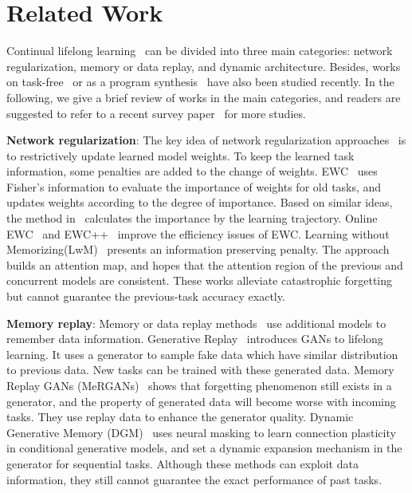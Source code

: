 \documentclass{article}
\begin{document}
\section{Related Work}
Continual lifelong learning~\cite{lifelong_review19} can be divided into three main categories: network regularization, memory or data replay, and dynamic architecture.
Besides, works on task-free~\cite{19CVPR_Aljundi} or as a program synthesis~\cite{18NeurIPS_Valkov} have also been studied recently.
In the following, we give a brief review of works in the main categories, and readers are suggested to refer to a recent survey paper~\cite{lifelong_review19} for more studies.


\noindent\textbf{Network regularization}: 
The key idea of network regularization approaches~\cite{kirkpatrick2017overcoming,zenke2017continual, 17NeurIPS_Lee, Ritter2018OnlineSL,ICML18_Schwarz_ProgressC,chaudhry2018riemannian,dhar2018learning} is to restrictively update learned model weights.
To keep the learned task information, some penalties are added to the change of weights. 
EWC~\cite{kirkpatrick2017overcoming} uses Fisher's information to evaluate the importance of weights for old tasks, and updates weights according to the degree of importance. 
Based on similar ideas, the method in~\cite{zenke2017continual} calculates the importance by the learning trajectory. 
Online EWC~\cite{ICML18_Schwarz_ProgressC} and EWC++~\cite{chaudhry2018riemannian} improve the efficiency issues of EWC. 
Learning without Memorizing(LwM)~\cite{dhar2018learning} presents an information preserving penalty. 
The approach builds an attention map, and hopes that the attention region of the previous and concurrent models are consistent.
These works alleviate catastrophic forgetting but cannot guarantee the previous-task accuracy exactly.


\noindent\textbf{Memory replay}: 
Memory or data replay methods~\cite{rebuffi2017icarl, shin2017continual, kemker2017fearnet, brahma2018subset, Wu2018IncrementalCL,  wu2018memory,  19ICLR_Hu, 19AAAI_Riemer, 19ICLR_Riemer, ostapenko2019learning} use additional models to remember data information. 
Generative Replay~\cite{shin2017continual} introduces GANs to lifelong learning. 
It uses a generator to sample fake data which have similar distribution to previous data. 
New tasks can be trained with these generated data. 
Memory Replay GANs (MeRGANs)~\cite{wu2018memory} shows that forgetting phenomenon still exists in a generator, and the property of generated data will become worse with incoming tasks. 
They use replay data to enhance the generator quality. 
Dynamic Generative Memory (DGM)~\cite{ostapenko2019learning} uses neural masking to learn connection plasticity in conditional generative models, and set a dynamic expansion mechanism in the generator for sequential tasks. 
Although these methods can exploit data information, they still cannot guarantee the exact performance of past tasks.
\end{document}
